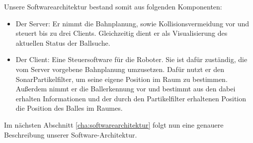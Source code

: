 Unsere Softwarearchitektur bestand somit aus folgenden Komponenten:
\begin{itemize}
\item Der Server: Er nimmt die Bahnplanung, sowie Kollisionsvermeidung
  vor und steuert bis zu drei Clients. Gleichzeitig dient er als
  Visualisierung des aktuellen Status der Ballsuche.
\item Der Client: Eine Steuersoftware für die Roboter. Sie ist dafür
  zuständig, die vom Server vorgebene Bahnplanung umzusetzen. Dafür
  nutzt er den SonarPartikelfilter, um seine eigene Position im Raum
  zu bestimmen. Außerdem nimmt er die Ballerkennung vor
  und bestimmt aus den dabei erhalten Informationen und der durch den
  Partikelfilter erhaltenen Position die Position des Balles im Raumes.
\end{itemize}
Im nächsten Abschnitt \ref{cha:softwarearchitektur} folgt nun eine genauere Beschreibung unserer
Software-Architektur.

